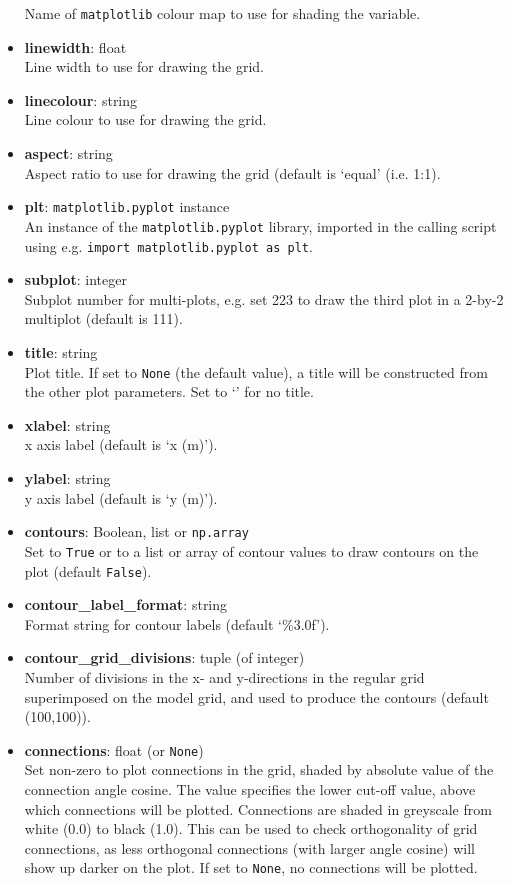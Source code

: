 \begin{itemize}
  Name of \texttt{matplotlib} colour map to use for shading the variable.
\item \textbf{linewidth}: float\\
  Line width to use for drawing the grid.
\item \textbf{linecolour}: string\\
  Line colour to use for drawing the grid.
\item \textbf{aspect}: string\\
  Aspect ratio to use for drawing the grid (default is `equal' (i.e. 1:1).
\item \textbf{plt}: \texttt{matplotlib.pyplot} instance\\
  An instance of the \texttt{matplotlib.pyplot} library, imported in the calling script using e.g. \texttt{import matplotlib.pyplot as plt}.
\item \textbf{subplot}: integer\\
  Subplot number for multi-plots, e.g. set 223 to draw the third plot in a 2-by-2 multiplot (default is 111).
\item \textbf{title}: string\\
  Plot title.  If set to \texttt{None} (the default value), a title will be constructed from the other plot parameters.  Set to `' for no title.
\item \textbf{xlabel}: string\\
  x axis label (default is `x (m)').
\item \textbf{ylabel}: string\\
  y axis label (default is `y (m)').
\item \textbf{contours}: Boolean, list or \texttt{np.array}\\
  Set to \texttt{True} or to a list or array of contour values to draw contours on the plot (default \texttt{False}).
\item \textbf{contour\_label\_format}: string\\
  Format string for contour labels (default `\%3.0f').
\item \textbf{contour\_grid\_divisions}: tuple (of integer)\\
  Number of divisions in the x- and y-directions in the regular grid superimposed on the model grid, and used to produce the contours (default (100,100)).
\item \textbf{connections}: float (or \texttt{None})\\
  Set non-zero to plot connections in the grid, shaded by absolute value of the connection angle cosine.  The value specifies the lower cut-off value, above which connections will be plotted.  Connections are shaded in greyscale from white (0.0) to black (1.0).  This can be used to check orthogonality of grid connections, as less orthogonal connections (with larger angle cosine) will show up darker on the plot.  If set to \texttt{None}, no connections will be plotted.

\end{itemize}
